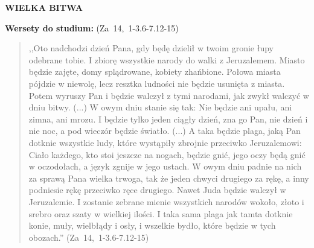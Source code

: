 \documentclass[10pt,a4paper,oneside]{article}
\begin{document}
\centerline{\textbf{\MakeUppercase{Wielka bitwa}}}
\begin{center}
\textbf{Wersety do studium:} \mbox{(Za 14, 1-3.6-7.12-15)}
\end{center}
\begin{quote}
,,Oto nadchodzi dzień Pana, gdy będę dzielił w twoim gronie łupy odebrane tobie. I zbiorę wszystkie narody do walki z Jeruzalemem. Miasto będzie zajęte, domy splądrowane, kobiety zhańbione. Połowa miasta pójdzie w niewolę, lecz resztka ludności nie będzie usunięta z miasta. Potem wyruszy Pan i będzie walczył z tymi narodami, jak zwykł walczyć w dniu bitwy. (...) W owym dniu stanie się tak: Nie będzie ani upału, ani zimna, ani mrozu. I będzie tylko jeden ciągły dzień, zna go Pan, nie dzień i nie noc, a pod wieczór będzie światło. (...) A taka będzie plaga, jaką Pan dotknie wszystkie ludy, które wystąpiły zbrojnie przeciwko Jeruzalemowi: Ciało każdego, kto stoi jeszcze na nogach, będzie gnić, jego oczy będą gnić w oczodołach, a język zgnije w jego ustach. W owym dniu padnie na nich za sprawą Pana wielka trwoga, tak że jeden chwyci drugiego za rękę, a inny podniesie rękę przeciwko ręce drugiego. Nawet Juda będzie walczył w Jeruzalemie. I zostanie zebrane mienie wszystkich narodów wokoło, złoto i srebro oraz szaty w wielkiej ilości. I taka sama plaga jak tamta dotknie konie, muły, wielbłądy i osły, i wszelkie bydło, które będzie w tych obozach.'' \mbox{(Za 14, 1-3.6-7.12-15)}
\end{quote}
\end{document}

